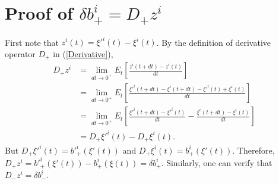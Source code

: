 \documentclass[%
 aip, 
 amsmath,amssymb,amsthm,
 nofootinbib,
 reprint,
]{revtex4-1}
\begin{document}
\section{Proof of $\delta b^i_+=D_+z^i$}
\label{AppendixC}
First note that $z^i(t) = \xi'^i(t) - \xi^i(t)$. By the definition of derivative operator $D_+$ in (\ref{Derivative}),
\begin{equation}
    \begin{split}
        D_+z^i &= \lim_{dt\to 0^+} E_t [\frac{z^i(t+dt)-z^i(t)}{dt}] \\
        &=\lim_{dt\to 0^+} E_t [\frac{\xi'^{i}(t+dt)-\xi^{i}(t+dt)-\xi'^{i}(t)+\xi^{i}(t)}{dt}] \\
        &=\lim_{dt\to 0^+} E_t [\frac{\xi'^{i}(t+dt)-\xi'^{i}(t)}{dt} - \frac{\xi^{i}(t+dt)-\xi^{i}(t)}{dt}] \\
        &=D_+\xi'^i(t) - D_+\xi^i(t). 
    \end{split}
\end{equation}
But $D_+\xi'^i(t)=b'^i_+(\xi'(t))$ and $D_+\xi^i(t)=b^i_+(\xi'(t))$. Therefore, $D_+z^i = b'^i_+(\xi'(t)) - b^i_+(\xi(t)) = \delta b^i_+$. Similarly, one can verify that $D_-z^i=\delta b^i_-$.
\end{document}
